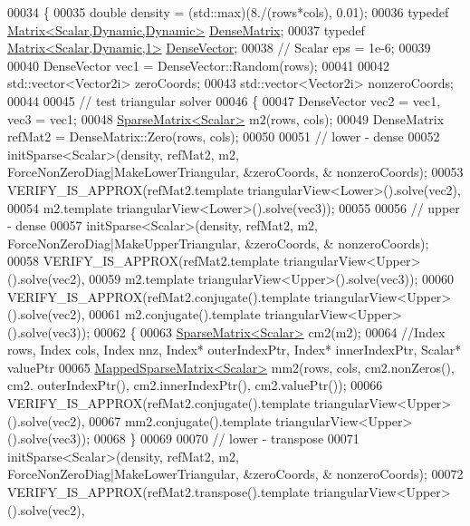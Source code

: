 \begin{DoxyCode}
00034 \{
00035   \textcolor{keywordtype}{double} density = (std::max)(8./(rows*cols), 0.01);
00036   \textcolor{keyword}{typedef} \hyperlink{group___core___module}{Matrix<Scalar,Dynamic,Dynamic>} 
      \hyperlink{group___core___module}{DenseMatrix};
00037   \textcolor{keyword}{typedef} \hyperlink{group___core___module}{Matrix<Scalar,Dynamic,1>} \hyperlink{group___core___module}{DenseVector};
00038   \textcolor{comment}{// Scalar eps = 1e-6;}
00039 
00040   DenseVector vec1 = DenseVector::Random(rows);
00041 
00042   std::vector<Vector2i> zeroCoords;
00043   std::vector<Vector2i> nonzeroCoords;
00044 
00045   \textcolor{comment}{// test triangular solver}
00046   \{
00047     DenseVector vec2 = vec1, vec3 = vec1;
00048     \hyperlink{group___sparse_core___module}{SparseMatrix<Scalar>} m2(rows, cols);
00049     DenseMatrix refMat2 = DenseMatrix::Zero(rows, cols);
00050 
00051     \textcolor{comment}{// lower - dense}
00052     initSparse<Scalar>(density, refMat2, m2, ForceNonZeroDiag|MakeLowerTriangular, &zeroCoords, &
      nonzeroCoords);
00053     VERIFY\_IS\_APPROX(refMat2.template triangularView<Lower>().solve(vec2),
00054                      m2.template triangularView<Lower>().solve(vec3));
00055 
00056     \textcolor{comment}{// upper - dense}
00057     initSparse<Scalar>(density, refMat2, m2, ForceNonZeroDiag|MakeUpperTriangular, &zeroCoords, &
      nonzeroCoords);
00058     VERIFY\_IS\_APPROX(refMat2.template triangularView<Upper>().solve(vec2),
00059                      m2.template triangularView<Upper>().solve(vec3));
00060     VERIFY\_IS\_APPROX(refMat2.conjugate().template triangularView<Upper>().solve(vec2),
00061                      m2.conjugate().template triangularView<Upper>().solve(vec3));
00062     \{
00063       \hyperlink{group___sparse_core___module}{SparseMatrix<Scalar>} cm2(m2);
00064       \textcolor{comment}{//Index rows, Index cols, Index nnz, Index* outerIndexPtr, Index* innerIndexPtr, Scalar* valuePtr}
00065       \hyperlink{class_eigen_1_1_mapped_sparse_matrix}{MappedSparseMatrix<Scalar>} mm2(rows, cols, cm2.nonZeros(), cm2.
      outerIndexPtr(), cm2.innerIndexPtr(), cm2.valuePtr());
00066       VERIFY\_IS\_APPROX(refMat2.conjugate().template triangularView<Upper>().solve(vec2),
00067                        mm2.conjugate().template triangularView<Upper>().solve(vec3));
00068     \}
00069 
00070     \textcolor{comment}{// lower - transpose}
00071     initSparse<Scalar>(density, refMat2, m2, ForceNonZeroDiag|MakeLowerTriangular, &zeroCoords, &
      nonzeroCoords);
00072     VERIFY\_IS\_APPROX(refMat2.transpose().template triangularView<Upper>().solve(vec2),

\end{DoxyCode}
